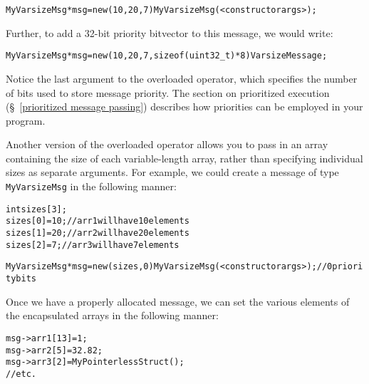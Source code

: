 \begin{alltt}
MyVarsizeMsg *msg = new (10, 20, 7) MyVarsizeMsg(<constructor args>);
\end{alltt}


Further, to add a 32-bit priority bitvector to this message, we would write:

\begin{alltt}
MyVarsizeMsg *msg = new (10, 20, 7, sizeof(uint32_t)*8) VarsizeMessage;
\end{alltt}

Notice the last argument to the overloaded  operator, which specifies 
the number of bits used to store message priority.
The section on prioritized execution (\S~\ref{prioritized message passing}) describes how
priorities can be employed in your program.

Another version of the overloaded  operator allows you to pass in
an array containing the size of each variable-length array, rather than specifying 
individual sizes as separate arguments. 
For example, we could create a message of type {\tt MyVarsizeMsg} in the following manner:

\begin{alltt}
int sizes[3];
sizes[0] = 10;               // arr1 will have 10 elements
sizes[1] = 20;               // arr2 will have 20 elements 
sizes[2] = 7;                // arr3 will have 7 elements 

MyVarsizeMsg *msg = new(sizes, 0) MyVarsizeMsg(<constructor args>); // 0 priority bits
\end{alltt}



\medskip
{}
Once we have a properly allocated message, 
we can set the various elements of the encapsulated arrays in the following manner:

\begin{alltt}
  msg->arr1[13] = 1;
  msg->arr2[5] = 32.82;
  msg->arr3[2] = MyPointerlessStruct();
  // etc.
\end{alltt}

